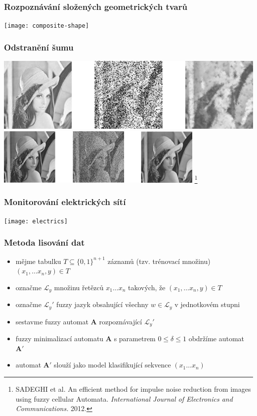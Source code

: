 \documentclass{beamer}
\begin{document}
\begin{frame}	%
\frametitle{Rozpoznávání složených geometrických tvarů}
\centering
\texttt{[image: composite-shape]}
\end{frame}

\begin{frame}	%
\frametitle{Odstranění šumu}
\centering
\includegraphics{noises-my}
\vfill \pause
\includegraphics{noises-cited}
\let\thefootnote\relax\footnote[1]{SADEGHI et al. An efficient method for impulse noise reduction from images using fuzzy cellular Automata. \textit{International Journal of Electronics and Communications.} 2012.}
\end{frame}

\begin{frame}	%
\frametitle{Monitorování elektrických sítí}
\centering
\texttt{[image: electrics]}
\end{frame}

\begin{frame}	%
\frametitle{Metoda lisování dat}
\begin{itemize}
	\item mějme tabulku $T \subseteq \{0, 1\}^{n+1}$ záznamů (tzv. trénovací množinu) $(x_1, \dots x_n, y) \in T$
	\item označme $\mathcal{L}_y$ množinu řetězců $x_1 \dots x_n$ takových, že $(x_1, \dots x_n, y) \in T$
	\item označme $\mathcal{L}_y'$ fuzzy jazyk obsahující všechny $w \in \mathcal{L}_y$ v jednotkovém stupni
	\item sestavme fuzzy automat $\mathbf{A}$ rozpoznávající $\mathcal{L}_y'$
	\item fuzzy minimalizací automatu $\mathbf{A}$ s parametrem $0 \leq \delta \leq 1$ obdržíme automat $\mathbf{A}'$
	\item automat $\mathbf{A}'$ slouží jako model klasifikující sekvence $(x_1 \dots x_n)$
\end{itemize}
\end{frame}
\end{document}
